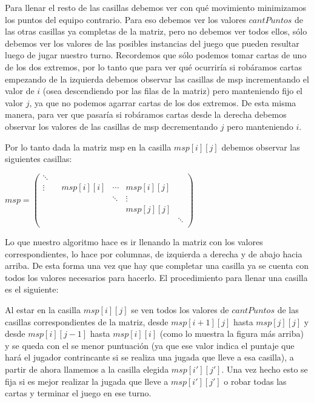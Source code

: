 Para llenar el resto de las casillas debemos ver con qué movimiento minimizamos los puntos del equipo contrario. Para eso debemos ver los valores $cantPuntos$ de las otras casillas ya completas de la matriz, pero no debemos ver todos ellos, sólo debemos ver los valores de las posibles instancias del juego que pueden resultar luego de jugar nuestro turno. Recordemos que sólo podemos tomar cartas de uno de los dos extremos, por lo tanto que para ver qué ocurriría si robáramos cartas empezando de la izquierda debemos observar las casillas de msp incrementando el valor de $i$ (osea descendiendo por las filas de la matriz) pero manteniendo fijo el valor $j$, ya que no podemos agarrar cartas de los dos extremos. De esta misma manera, para ver que pasaría si robáramos cartas desde la derecha debemos observar los valores de las casillas de msp decrementando $j$ pero manteniendo $i$.

Por lo tanto dada la matriz msp en la casilla $msp[i][j]$ debemos observar las siguientes casillas:

$msp= \left(
\begin{array}{cccccc}
 \ddots & & & & \\ 
 \vdots & & msp[i][i] & \cdots & msp[i][j] \\
 & & & \ddots & \vdots & \\
 & & & & msp[j][j] &\\
 & & & & & \ddots \\
 
\end{array}
\right)$

Lo que nuestro algoritmo hace es ir llenando la matriz con los valores correspondientes, lo hace por columnas, de izquierda a derecha y de abajo hacia arriba. De esta forma una vez que hay que completar una casilla ya se cuenta con todos los valores necesarios para hacerlo. El procedimiento para llenar una casilla es el siguiente:

Al estar en la casilla $msp[i][j]$ se ven todos los valores de $cantPuntos$ de las casillas correspondientes de la matriz, desde $msp[i+1][j]$ hasta $msp[j][j]$ y desde $msp[i][j-1]$ hasta $msp[i][i]$ (como lo muestra la figura más arriba) y se queda con el se menor puntuación (ya que ese valor indica el puntaje que hará el jugador contrincante si se realiza una jugada que lleve a esa casilla), a partir de ahora llamemos a la casilla elegida $msp[i'][j']$. Una vez hecho esto se fija si es mejor realizar la jugada que lleve a $msp[i'][j']$ o robar todas las cartas y terminar el juego en ese turno. 

